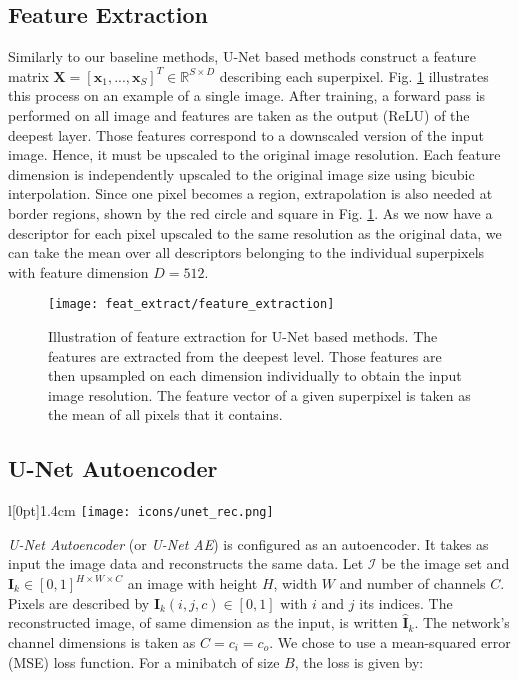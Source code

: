 \clearpage
\subsection{Feature Extraction} \label{feat_extract}
Similarly to our baseline methods, U-Net based methods construct a feature matrix $\boldsymbol{X} = [\boldsymbol{x}_1,...,\boldsymbol{x}_S]^T \in \mathbb{R}^{S \times D}$ describing each superpixel.
Fig. \ref{fig:feat_extract} illustrates this process on an example of a single image.
After training, a forward pass is performed on all image and features are taken as the output (ReLU) of the deepest layer.
Those features correspond to a downscaled version of the input image.
Hence, it must be upscaled to the original image resolution.
Each feature dimension is independently upscaled to the original image size using bicubic interpolation.
Since one pixel becomes a region, extrapolation is also needed at border regions, shown by the red circle and square in Fig. \ref{fig:feat_extract}.
As we now have a descriptor for each pixel upscaled to the same resolution as the original data, we can take the mean over all descriptors belonging to the individual superpixels with feature dimension $D=512$.
\vspace{10pt}

\begin{figure}[htbp]
  \centering
  \texttt{[image: feat\_extract/feature\_extraction]}
  \caption[Feature extraction model]{Illustration of feature extraction for U-Net based methods.
    The features are extracted from the deepest level.
    Those features are then upsampled on each dimension individually to obtain the input image resolution.
    The feature vector of a given superpixel is taken as the mean of all pixels that it contains.}
  \label{fig:feat_extract}
\end{figure}

\subsection{U-Net Autoencoder}
\begingroup
\setlength\intextsep{0pt}
\begin{wrapfigure}[4]{l}[0pt]{1.4cm}
\texttt{[image: icons/unet\_rec.png]}
\end{wrapfigure}

\textit{U-Net Autoencoder} (or \textit{U-Net AE}) is configured as an autoencoder.
It takes as input the image data and reconstructs the same data.
Let $\mathcal{I}$ be the image set and $\boldsymbol{I}_k \in [0,1]^{H \times W \times C}$ an image with height $H$, width $W$ and number of channels $C$.
Pixels are described by $\boldsymbol{I}_k(i,j,c) \in [0,1]$ with $i$ and $j$ its indices.
The reconstructed image, of same dimension as the input, is written $\boldsymbol{\hat{I}}_k$.
The network's channel dimensions is taken as $C = c_i = c_o$.
We chose to use a mean-squared error (MSE) loss function.
For a minibatch of size $B$, the loss is given by:

